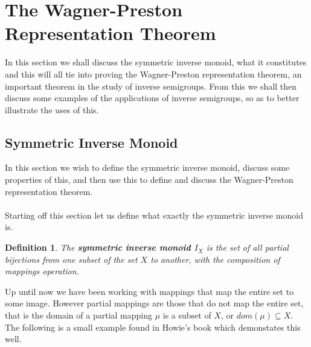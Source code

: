 \documentclass[12pt]{article}
\newtheorem{defn}[theorem]{Definition}
\begin{document}
\section{The Wagner-Preston Representation Theorem}
In this section we shall discuss the symmetric inverse monoid, what it constitutes and this will all tie into proving the Wagner-Preston representation theorem, an important theorem in the study of inverse semigroups. From this we shall then discuss some examples of the applications of inverse semigroups, so as to better illustrate the uses of this.
\subsection{Symmetric Inverse Monoid}
In this section we wish to define the symmetric inverse monoid, discuss some properties of this, and then use this to define and discuss the Wagner-Preston representation theorem.\\
\\Starting off this section let us define what exactly the symmetric inverse monoid is.
\begin{defn}
	The \textbf{symmetric inverse monoid $I_X$} is the set of all partial bijections from one subset of the set $X$ to another, with the composition of mappings operation.
\end{defn}
\noindent Up until now we have been working with mappings that map the entire set to some image. However partial mappings are those that do not map the entire set, that is the domain of a partial mapping $\mu$ is a subset of $X$, or $dom(\mu) \subseteq X$. The following is a small example found in Howie's book which demonstates this well\cite{3}.
\end{document}
